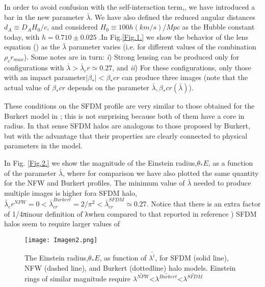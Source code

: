 \documentclass[15pt]{IEEEtran}
\begin{document}
In order to avoid confusion with the self-interaction term,\textlambda, we have introduced a bar in the new parameter \(\bar{\lambda}\).  We have  also  defined the  reduced  angular  distances \(d_A\equiv D_A H_0 /c\), and considered \(H_0 \equiv 100h(km/s)/Mpc\) as the Hubble constant today, with \(h= 0.710\pm 0.025 \) \cite{14}.In Fig.\eqref{Fig.1.} we show the behavior of the lens equation () as the \(\bar{\lambda}\) parameter varies (i.e.  for different values of the combination \(\rho_c r_{max}\)).  Some notes are in turn: \textit{i}) Strong lensing can be produced only for configurations with \(\bar{\lambda}>\bar{\lambda}_cr\simeq 0.27\), and \textit{ii}) For these configurations, only those with an impact parameter\(|\beta_*|<\beta_*cr\) can produce three images (note that the actual value of \(\beta_*cr\) depends on the parameter \(\bar{\lambda}, \beta_*cr(\bar{\lambda})\)).
\par
These conditions on the SFDM profile are very similar to those obtained for the Burkert model in \cite{Park_2003} ; this is not surprising because both of them have a core in radius.  In that sense SFDM halos are analogous to those proposed by Burkert, but with the advantage that their properties are clearly connected to physical parameters in the model.
\par
In  Fig. \eqref{Fig.2.}  we  show  the  magnitude  of  the  Einstein  radius,\(\theta_*E\),  as  a  function  of  the  parameter \(\bar{\lambda}\),  where  for comparison we have also plotted the same quantity for the NFW \cite{17} and Burkert  profiles.  The minimum value of \(\bar{\lambda}\) needed to produce multiple images is higher fora SFDM halo, \(\bar{\lambda}_cr ^{NFW}= 0 <\bar{\lambda}_{cr}^{Burkert}= 2/\pi^2 < \bar{\lambda}_{cr} ^ {SFDM} \simeq 0.27\).  Notice  that  there  is  an  extra  factor  of  1/4πinour  definition  of ̄λwhen  compared  to  that  reported in reference )  SFDM halos seem to require larger values of \\[5cm]

{\begin{figure}[h]
    \centering
    \texttt{[image: Imagen2.png]}
    \caption{The  Einstein  radius,\(\theta_*E\),  as  function  of \(\bar{\lambda^i}\),  for SFDM (solid line), NFW (dashed line), and Burkert (dottedline) halo models.  Einstein rings of similar magnitude require \(\bar{\lambda^{NFW}}\)<\(\bar{\lambda^{Burkert}}\)<\(\bar{\lambda^{SFDM}}\)}
    \label{Fig.2.}
\end{figure}}
\end{document}
